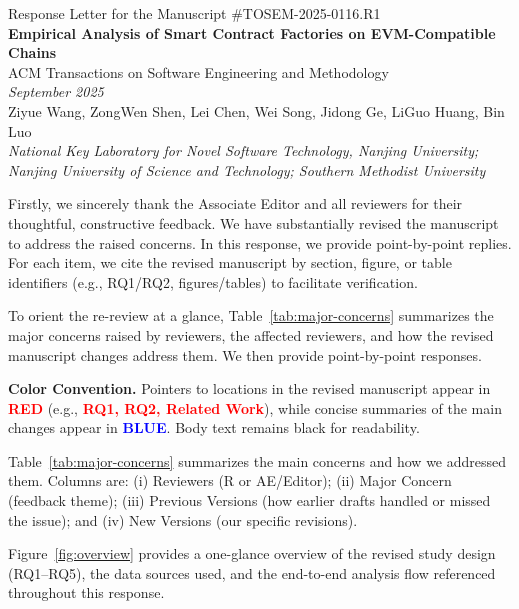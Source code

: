 \documentclass[acmsmall]{acmart}
\begin{document}
	\pagestyle{plain}
	\begin{center}
		\Large Response Letter for the Manuscript \#TOSEM-2025-0116.R1 \\[1.5em] \LARGE\textbf{Empirical
		Analysis of Smart Contract Factories on EVM-Compatible Chains} \\[1.5em] \large ACM Transactions
		on Software Engineering and Methodology \\[1em] \normalsize \textit{September 2025}
		\\[1.5em] \normalsize Ziyue Wang, ZongWen Shen, Lei Chen, Wei Song, Jidong Ge, LiGuo Huang,
		Bin Luo \\[0.5em] \textit{National Key Laboratory for Novel Software Technology, Nanjing University;
		Nanjing University of Science and Technology; Southern Methodist University} \\[8em]
	\end{center}

	Firstly, we sincerely thank the Associate Editor and all reviewers for their thoughtful,
	constructive feedback. We have substantially revised the manuscript to address the raised concerns.
	In this response, we provide point-by-point replies. For each item, we cite the revised manuscript
	by section, figure, or table identifiers (e.g., RQ1/RQ2, figures/tables) to facilitate
	verification.

	\vspace{0.5em}
	\noindent
	To orient the re-review at a glance, Table~\ref{tab:major-concerns} summarizes the major concerns
	raised by reviewers, the affected reviewers, and how the revised manuscript changes address them.
	We then provide point-by-point responses.

	\vspace{0.25em}
	\noindent
	\textbf{Color Convention.} Pointers to locations in the revised manuscript appear in \textcolor{red}{\textbf{RED}}
	(e.g., \textcolor{red}{\textbf{RQ1, RQ2, Related Work}}), while concise summaries of the main
	changes appear in \textcolor{blue}{\textbf{BLUE}}. Body text remains black for readability.

	\newpage

	
	Table~\ref{tab:major-concerns} summarizes the main concerns and how we addressed them. Columns
	are: (i) Reviewers (R or AE/Editor); (ii) Major Concern (feedback theme); (iii) Previous Versions
	(how earlier drafts handled or missed the issue); and (iv) New Versions (our specific revisions).

\noindent Figure~\ref{fig:overview} provides a one-glance overview of the revised study design (RQ1--RQ5), the data sources used, and the end-to-end analysis flow referenced throughout this response.
\end{document}
